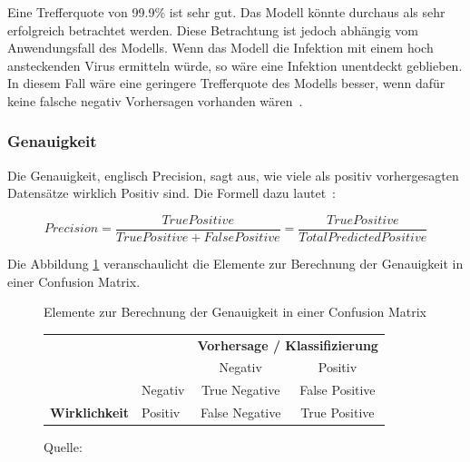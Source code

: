 Eine Trefferquote von 99.9\% ist sehr gut. Das Modell könnte durchaus als sehr erfolgreich betrachtet werden. Diese Betrachtung ist jedoch abhängig vom Anwendungsfall des Modells. Wenn das Modell die Infektion mit einem hoch ansteckenden Virus ermitteln würde, so wäre eine Infektion unentdeckt geblieben. In diesem Fall wäre eine geringere Trefferquote des Modells besser, wenn dafür keine falsche negativ Vorhersagen vorhanden wären~\autocite{TDSAccuracy}.

\subsubsection{Genauigkeit}

Die Genauigkeit, englisch Precision, sagt aus, wie viele als positiv vorhergesagten Datensätze wirklich Positiv sind. Die Formell dazu lautet~\autocite{TDSAccuracy}: 

\nopagebreak

$$Precision = \frac{True Positive}{True Positive + False Positive} = \frac{True Positive}{Total Predicted Positive}$$

Die Abbildung \ref{cm-precision} veranschaulicht die Elemente zur Berechnung der Genauigkeit in einer Confusion Matrix.

\begin{figure}[h!]
    \centering
    \captionsetup{width=.9\linewidth}
    \caption{Elemente zur Berechnung der Genauigkeit in einer Confusion Matrix}
    \label{cm-precision}
    \def\arraystretch{1.5}
    \begin{tabular}{llcc}
        \multicolumn{2}{l}{}                                                                        & \multicolumn{2}{c}{\textbf{Vorhersage / Klassifizierung}}                                         \\ \cline{3-4} 
        \multicolumn{1}{c}{\textbf{}}                                & \multicolumn{1}{l|}{}        & \multicolumn{1}{c|}{Negativ}        & \multicolumn{1}{c|}{\cellcolor[HTML]{B5D0EE}Positiv}        \\ \cline{2-4} 
        \multicolumn{1}{l|}{}                                        & \multicolumn{1}{l|}{Negativ} & \multicolumn{1}{c|}{True Negative}  & \multicolumn{1}{c|}{\cellcolor[HTML]{B5D0EE}False Positive} \\ \cline{2-4} 
        \multicolumn{1}{l|}{\multirow{-2}{*}{\textbf{Wirklichkeit}}} & \multicolumn{1}{l|}{Positiv} & \multicolumn{1}{c|}{False Negative} & \multicolumn{1}{c|}{\cellcolor[HTML]{B5D0EE}True Positive}  \\ \cline{2-4} 
    \end{tabular}
    \caption*{Quelle: \textcite{TDSAccuracy}}
\end{figure}

